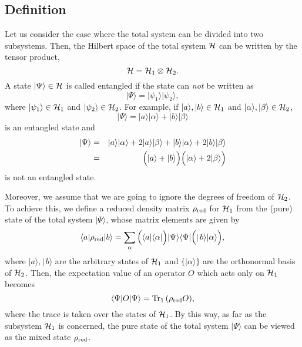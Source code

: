 \documentclass[12pt,epsf]{article}
\begin{document}
\subsection{Definition}
Let us consider the case where the total system 
can be divided into two subsystems.
Then, the Hilbert space of the total system ${\cal H}$
can be written by the tensor product,
\begin{equation}
{\cal H}={\cal H}_1\otimes{\cal H}_2.
\end{equation}
A state $|\Psi\rangle\in{\cal H}$ is called entangled
if the state can {\em not} be written as
\begin{equation}
 |\Psi\rangle=|\psi_1\rangle|\psi_2\rangle,
\end{equation}
where $|\psi_1\rangle\in{\cal H}_1$ and
$|\psi_2\rangle\in{\cal H}_2$.
For example,
if $|a\rangle,|b\rangle\in{\cal H}_1$ and
$|\alpha\rangle,|\beta\rangle\in{\cal H}_2$,
\begin{equation}
 |\Psi\rangle=|a\rangle|\alpha\rangle
    +|b\rangle|\beta\rangle
\end{equation}
is an entangled state and
\begin{eqnarray}
 |\Psi\rangle &=& |a\rangle|\alpha\rangle
    +2|a\rangle|\beta\rangle+|b\rangle|\alpha\rangle
   +2|b\rangle|\beta\rangle \nonumber \\
    &=& \Bigl(|a\rangle+|b\rangle\Bigr)
       \Bigl(|\alpha\rangle+2|\beta\rangle\Bigr)
\end{eqnarray}
is not an entangled state.

Moreover, we assume that we are going to ignore the degrees
of freedom of ${\cal H}_2$.
To achieve this, we define a reduced density matrix
$\rho_{{\rm red}}$ for ${\cal H}_1$ from the (pure) state
of the total system $|\Psi\rangle$,
whose matrix elements are given by
\begin{equation}
  \langle a|\rho_{{\rm red}}|b \rangle =
    \sum_\alpha\, \Bigl(\langle a|\langle\alpha |\Bigr)
   |\Psi\rangle\langle\Psi|
  \Bigl(|\, b\rangle |\alpha\rangle\Bigr),
\label{reduced}
\end{equation}
where $|a \rangle,|\,b \rangle$ are the arbitrary
states of ${\cal H}_1$ and $\{|\alpha \rangle\}$
are the orthonormal basis of ${\cal H}_2$.
Then, the expectation value of an operator $O$ which acts
only on ${\cal H}_1$ becomes
\begin{equation}
  \langle \Psi | O | \Psi \rangle
  ={\rm Tr}_1\,(\rho_{{\rm red}} O),
\end{equation}
where the trace is taken over the states of ${\cal H}_1$.
By this way, as far as the subsystem ${\cal H}_1$ is concerned,
the pure state of the total system $|\Psi\rangle$ can be viewed
as the mixed state $\rho_{{\rm red}}$.
\end{document}
